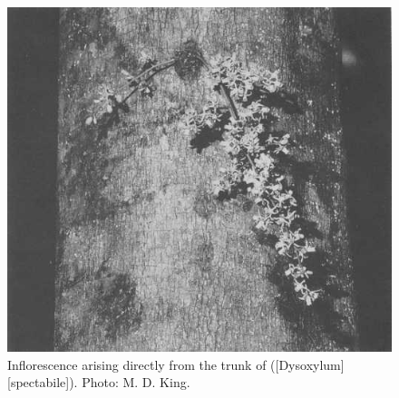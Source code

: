 \begin{figure}[htb]
	\centering
	\begin{minipage}[t]{0.61\textwidth}
		\centering
		\includegraphics[width=\textwidth]{graphics/figure16infloresence.jpg}
    	\caption[Inflorescence arising directly from the trunk of kohekohe]{Inflorescence arising directly from the trunk of  ([Dysoxylum][spectabile]).
    	Photo:  M. D. King.}%
    	\label{fig:16infloresence}
	\end{minipage}\hfill%
	\begin{minipage}[t]{0.37\textwidth}
    	\centering

\end{minipage}
\end{figure}
